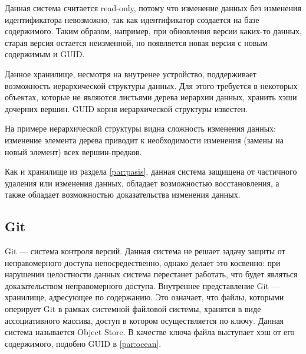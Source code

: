 Данная система считается read-only, потому что изменение данных без изменения идентификатора невозможно, так как идентификатор создается на базе содержимого. Таким образом, например, при обновления версии каких-то данных, старая версия остается неизменной, но появляется новая версия с новым содержимым и GUID.

Данное хранилище, несмотря на внутренее устройство, поддерживает возможность иерархической структуры данных. Для этого требуется в некоторых объектах, которые не являются листьями дерева иерархии данных, хранить хэши дочерних вершин. GUID корня иерархической структуры известен.

На примере иерархической структуры видна сложность изменения данных: изменение элемента дерева приводит к необходимости изменения (замены на новый элемент) всех вершин-предков.

Как и хранилище из раздела \ref{par:pasis}, данная система защищена от частичного удаления или изменения данных, обладает возможностью восстановления, а также обладает возможностью доказательства изменения данных.

\subsection{Git}

Git \cite{git} --- система контроля версий. Данная система не решает задачу защиты от неправомерного доступа непосредественно, однако делает это косвенно: при нарушении целостности данных система перестанет работать, что будет являться доказательством неправомерного доступа. Внутреннее представление Git --- хранилище, адресующее по содержанию. Это означает, что файлы, которыми оперирует Git в рамках системной файловой системы, хранятся в виде ассоциативного массива, доступ в котором осуществляется по ключу. Данная система называется Object Store. В качестве ключа файла выступает хэш от его содержимого, подобно GUID в \ref{par:ocean}.

